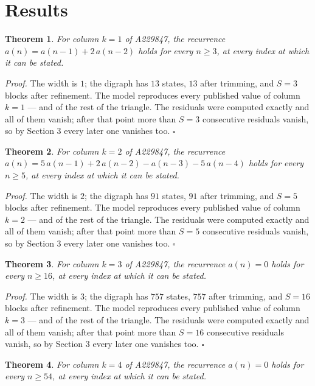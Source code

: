 \documentclass[11pt]{article}
\newtheorem{theorem}{Theorem}
\theoremstyle{definition}
\begin{document}
\section{Results}

\begin{theorem} For column $k = 1$ of A229847, the recurrence $a(n) = a(n-1) + 2\,a(n-2)$ holds for every $n \ge 3$, at every index at which it can be stated.\end{theorem}

{\itshape Proof.} The width is $1$; the digraph has $13$ states, $13$ after trimming, and $S = 3$ blocks after refinement. The model reproduces every published value of column $k = 1$ --- and of the rest of the triangle. The residuals were computed exactly and all of them vanish; after that point more than $S = 3$ consecutive residuals vanish, so by Section 3 every later one vanishes too. $\square$

\begin{theorem} For column $k = 2$ of A229847, the recurrence $a(n) = 5\,a(n-1) + 2\,a(n-2) - a(n-3) - 5\,a(n-4)$ holds for every $n \ge 5$, at every index at which it can be stated.\end{theorem}

{\itshape Proof.} The width is $2$; the digraph has $91$ states, $91$ after trimming, and $S = 5$ blocks after refinement. The model reproduces every published value of column $k = 2$ --- and of the rest of the triangle. The residuals were computed exactly and all of them vanish; after that point more than $S = 5$ consecutive residuals vanish, so by Section 3 every later one vanishes too. $\square$

\begin{theorem} For column $k = 3$ of A229847, the recurrence $a(n) = 0$ holds for every $n \ge 16$, at every index at which it can be stated.\end{theorem}

{\itshape Proof.} The width is $3$; the digraph has $757$ states, $757$ after trimming, and $S = 16$ blocks after refinement. The model reproduces every published value of column $k = 3$ --- and of the rest of the triangle. The residuals were computed exactly and all of them vanish; after that point more than $S = 16$ consecutive residuals vanish, so by Section 3 every later one vanishes too. $\square$

\begin{theorem} For column $k = 4$ of A229847, the recurrence $a(n) = 0$ holds for every $n \ge 54$, at every index at which it can be stated.\end{theorem}
\end{document}
